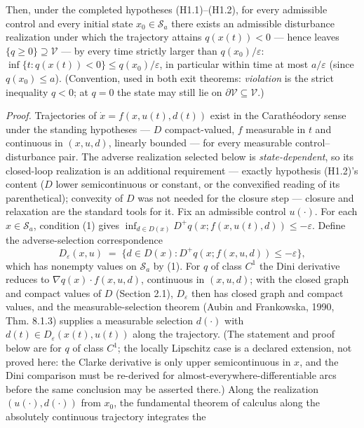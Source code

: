 \documentclass[11pt]{article}
\begin{document}
Then, under the completed hypotheses (H1.1)--(H1.2), for every
admissible control and every initial state \(x_0 \in \mathcal{S}_a\)
there exists an admissible disturbance realization under which the
trajectory attains \(q(x(t)) < 0\) --- hence leaves
\(\{ q \ge 0 \} \supseteq \mathcal{V}\) --- by every time strictly
larger than \(q(x_0)/\varepsilon\):
\(\inf\{ t : q(x(t)) < 0 \} \le q(x_0)/\varepsilon\), in particular
within time at most \(a/\varepsilon\) (since \(q(x_0) \le a\)).
(Convention, used in both exit theorems: \emph{violation} is the strict
inequality \(q < 0\); at \(q = 0\) the state may still lie on
\(\partial \mathcal{V} \subseteq \mathcal{V}\).)

\emph{Proof.} Trajectories of \(\dot x = f(x, u(t), d(t))\) exist in the
Carath\'eodory sense under the standing hypotheses --- \(D\)
compact-valued, \(f\) measurable in \(t\) and continuous in \((x,u,d)\),
linearly bounded --- for every measurable control--disturbance pair. The
adverse realization selected below is \emph{state-dependent}, so its
closed-loop realization is an additional requirement --- exactly
hypothesis (H1.2)'s content (\(D\) lower semicontinuous or constant, or
the convexified reading of its parenthetical); convexity of \(D\) was
not needed for the closure step --- closure and relaxation are the
standard tools for it. Fix an admissible control \(u(\cdot)\). For each
\(x \in \mathcal{S}_a\), condition (1) gives
\(\inf_{d \in D(x)} D^+ q(x; f(x,u(t),d)) \le -\varepsilon\). Define the
adverse-selection correspondence
\[D_{\varepsilon}(x, u) \;=\; \big\{ d \in D(x) : D^+ q(x; f(x,u,d)) \le -\varepsilon \big\},\]
which has nonempty values on \(\mathcal{S}_a\) by (1). For \(q\) of
class \(C^1\) the Dini derivative reduces to
\(\nabla q(x) \cdot f(x,u,d)\), continuous in \((x,u,d)\); with the
closed graph and compact values of \(D\) (Section 2.1),
\(D_{\varepsilon}\) then has closed graph and compact values, and the
measurable-selection theorem (Aubin and Frankowska, 1990, Thm. 8.1.3)
supplies a measurable selection \(d(\cdot)\) with
\(d(t) \in D_{\varepsilon}(x(t), u(t))\) along the trajectory. (The
statement and proof below are for \(q\) of class \(C^1\); the locally
Lipschitz case is a declared extension, not proved here: the Clarke
derivative is only upper semicontinuous in \(x\), and the Dini
comparison must be re-derived for almost-everywhere-differentiable arcs
before the same conclusion may be asserted there.) Along the realization
\((u(\cdot), d(\cdot))\) from \(x_0\), the fundamental theorem of
calculus along the absolutely continuous trajectory integrates the
\end{document}
